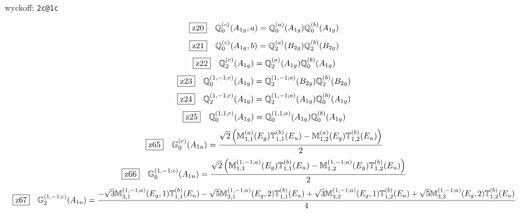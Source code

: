 \documentclass[fleqn,10pt,landscape]{jsarticle}
\begin{document}
\noindent\quad * wyckoff: \texttt{2c@1c}

\begin{dmath*}
\hspace*{3mm}\fbox{z20}\quad \mathbb{Q}_{0}^{(c)}(A_{1g},a)=\mathbb{Q}_{0}^{(a)}(A_{1g}) \mathbb{Q}_{0}^{(b)}(A_{1g})
\end{dmath*}
\begin{dmath*}
\hspace*{3mm}\fbox{z21}\quad \mathbb{Q}_{0}^{(c)}(A_{1g},b)=\mathbb{Q}_{2}^{(a)}(B_{2g}) \mathbb{Q}_{2}^{(b)}(B_{2g})
\end{dmath*}
\begin{dmath*}
\hspace*{3mm}\fbox{z22}\quad \mathbb{Q}_{2}^{(c)}(A_{1g})=\mathbb{Q}_{2}^{(a)}(A_{1g}) \mathbb{Q}_{0}^{(b)}(A_{1g})
\end{dmath*}
\begin{dmath*}
\hspace*{3mm}\fbox{z23}\quad \mathbb{Q}_{0}^{(1,-1;c)}(A_{1g})=\mathbb{Q}_{2}^{(1,-1;a)}(B_{2g}) \mathbb{Q}_{2}^{(b)}(B_{2g})
\end{dmath*}
\begin{dmath*}
\hspace*{3mm}\fbox{z24}\quad \mathbb{Q}_{2}^{(1,-1;c)}(A_{1g})=\mathbb{Q}_{2}^{(1,-1;a)}(A_{1g}) \mathbb{Q}_{0}^{(b)}(A_{1g})
\end{dmath*}
\begin{dmath*}
\hspace*{3mm}\fbox{z25}\quad \mathbb{Q}_{0}^{(1,1;c)}(A_{1g})=\mathbb{Q}_{0}^{(1,1;a)}(A_{1g}) \mathbb{Q}_{0}^{(b)}(A_{1g})
\end{dmath*}
\begin{dmath*}
\hspace*{3mm}\fbox{z65}\quad \mathbb{G}_{0}^{(c)}(A_{1u})=\frac{\sqrt{2} \left(\mathbb{M}_{1,1}^{(a)}(E_{g}) \mathbb{T}_{1,1}^{(b)}(E_{u}) - \mathbb{M}_{1,2}^{(a)}(E_{g}) \mathbb{T}_{1,2}^{(b)}(E_{u})\right)}{2}
\end{dmath*}
\begin{dmath*}
\hspace*{3mm}\fbox{z66}\quad \mathbb{G}_{0}^{(1,-1;c)}(A_{1u})=\frac{\sqrt{2} \left(\mathbb{M}_{1,1}^{(1,-1;a)}(E_{g}) \mathbb{T}_{1,1}^{(b)}(E_{u}) - \mathbb{M}_{1,2}^{(1,-1;a)}(E_{g}) \mathbb{T}_{1,2}^{(b)}(E_{u})\right)}{2}
\end{dmath*}
\begin{dmath*}
\hspace*{3mm}\fbox{z67}\quad \mathbb{G}_{2}^{(1,-1;c)}(A_{1u})=\frac{- \sqrt{3} \mathbb{M}_{3,1}^{(1,-1;a)}(E_{g},1) \mathbb{T}_{1,1}^{(b)}(E_{u}) - \sqrt{5} \mathbb{M}_{3,1}^{(1,-1;a)}(E_{g},2) \mathbb{T}_{1,1}^{(b)}(E_{u}) + \sqrt{3} \mathbb{M}_{3,2}^{(1,-1;a)}(E_{g},1) \mathbb{T}_{1,2}^{(b)}(E_{u}) + \sqrt{5} \mathbb{M}_{3,2}^{(1,-1;a)}(E_{g},2) \mathbb{T}_{1,2}^{(b)}(E_{u})}{4}
\end{dmath*}
\end{document}
